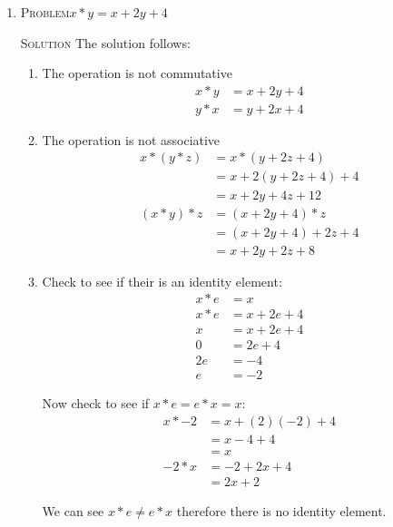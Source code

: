 \documentclass[draft,twoside]{amsart}
\newcommand{\Solution}{\textsc{Solution}\xspace}
\newcommand{\Problem}{\textsc{Problem}\xspace}
\begin{document}
\begin{enumerate}

   \item \Problem $x*y = x + 2y + 4$ 

   \noindent \Solution The solution follows:

   \begin{enumerate}
      \item The operation is not commutative
      \begin{align*}
         x * y & = x + 2y + 4 \\
	 y * x & = y + 2x + 4
      \end{align*}

      \item The operation is not associative
      \begin{align*}
         x * (y * z) & = x * (y + 2z + 4) \\
	             & = x + 2(y + 2z + 4) + 4 \\
		     & = x + 2y + 4z + 12  \\
         (x * y) * z & = (x + 2y + 4) * z \\
	             & = (x + 2y + 4) + 2z + 4 \\
		     & = x + 2y + 2z + 8
      \end{align*}

      \item Check to see if their is an identity element:
      \begin{align*}
         x * e & = x           \\ 
         x * e & = x + 2e + 4  \\
	     x & = x + 2e + 4  \\
	     0 & =     2e + 4  \\
	    2e & =         -4  \\
	     e & =         -2  
      \end{align*}

      Now check to see if $x*e=e*x=x$:
      \begin{align*}
         x * -2 & = x + (2)(-2) + 4 \\
	        & = x - 4 + 4       \\
		& = x               \\
	 -2 * x & = -2 + 2x + 4     \\
	        & = 2x + 2          
      \end{align*}

      We can see $x*e \ne e*x$ therefore there is no identity element.


\end{enumerate}
\end{enumerate}
\end{document}
